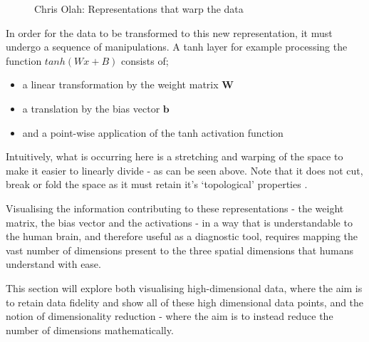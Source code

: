 \documentclass[a4paper,11pt,titlepage]{article}
\begin{document}
		\begin{figure}[H]
    			\centering	
    			\qquad
    			\caption{Chris Olah: Representations that warp the data}%
		\end{figure}		
		
		\par 
		In order for the data to be transformed to this new representation, it must undergo a sequence of manipulations. A tanh layer for example processing the function $ tanh(Wx + B) $ consists of; 
		\begin{itemize}
			\item a linear transformation by the weight matrix $ \bm{W} $
			\item a translation by the bias vector $ \bm{b} $
			\item and a point-wise application of the tanh activation function
		\end{itemize}
		Intuitively, what is occurring here is a stretching and warping of the space to make it easier to linearly divide - as can be seen above. Note that it does not cut, break or fold the space as it must retain it's `topological' properties \cite{Choi2005}.
	\par 
 	Visualising the information contributing to these representations - the weight matrix, the bias vector and the activations - in a way that is understandable to the human brain, and therefore useful as a diagnostic tool, requires mapping the vast number of dimensions present to the three spatial dimensions that  humans understand with ease. 
	\par 
	This section will explore both visualising high-dimensional data, where the aim is to retain data fidelity and show all of these high dimensional data points, and the notion of dimensionality reduction - where the aim is to instead reduce the number of dimensions mathematically.
\end{document}
